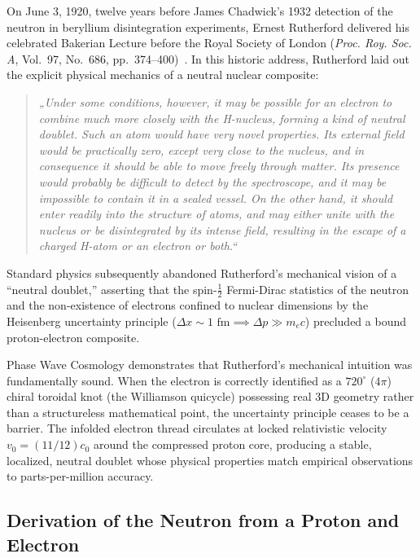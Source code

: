 \documentclass[11pt,a4paper]{article}
\begin{document}
On June 3, 1920, twelve years before James Chadwick's 1932 detection of the neutron in beryllium disintegration experiments, Ernest Rutherford delivered his celebrated Bakerian Lecture before the Royal Society of London (\textit{Proc. Roy. Soc. A}, Vol.~97, No.~686, pp.~374--400)~\cite{Rutherford1920}. In this historic address, Rutherford laid out the explicit physical mechanics of a neutral nuclear composite:
\begin{quote}
\textit{„Under some conditions, however, it may be possible for an electron to combine much more closely with the H-nucleus, forming a kind of neutral doublet. Such an atom would have very novel properties. Its external field would be practically zero, except very close to the nucleus, and in consequence it should be able to move freely through matter. Its presence would probably be difficult to detect by the spectroscope, and it may be impossible to contain it in a sealed vessel. On the other hand, it should enter readily into the structure of atoms, and may either unite with the nucleus or be disintegrated by its intense field, resulting in the escape of a charged H-atom or an electron or both.“}
\end{quote}
Standard physics subsequently abandoned Rutherford's mechanical vision of a ``neutral doublet,'' asserting that the spin-$\frac{1}{2}$ Fermi-Dirac statistics of the neutron and the non-existence of electrons confined to nuclear dimensions by the Heisenberg uncertainty principle ($\Delta x \sim 1\text{ fm} \implies \Delta p \gg m_e c$) precluded a bound proton-electron composite.

Phase Wave Cosmology demonstrates that Rutherford's mechanical intuition was fundamentally sound. When the electron is correctly identified as a $720^\circ$ ($4\pi$) chiral toroidal knot (the Williamson quicycle) possessing real 3D geometry rather than a structureless mathematical point, the uncertainty principle ceases to be a barrier. The infolded electron thread circulates at locked relativistic velocity $v_0 = (11/12)c_0$ around the compressed proton core, producing a stable, localized, neutral doublet whose physical properties match empirical observations to parts-per-million accuracy.

\subsection{Derivation of the Neutron from a Proton and Electron}
\label{subsec:neutron_derivation}
\end{document}
